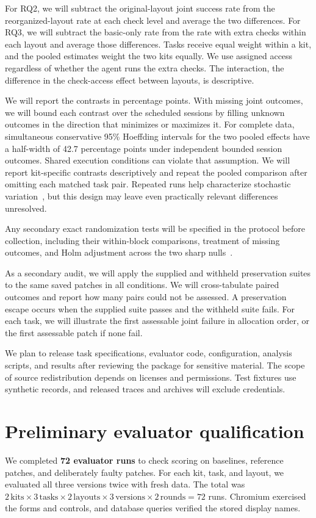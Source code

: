 \documentclass[11pt,a4paper]{article}
\begin{document}
For RQ2, we will subtract the original-layout joint success rate from the reorganized-layout rate at each check level and average the two differences. For RQ3, we will subtract the basic-only rate from the rate with extra checks within each layout and average those differences. Tasks receive equal weight within a kit, and the pooled estimates weight the two kits equally. We use assigned access regardless of whether the agent runs the extra checks. The interaction, the difference in the check-access effect between layouts, is descriptive.

We will report the contrasts in percentage points. With missing joint outcomes, we will bound each contrast over the scheduled sessions by filling unknown outcomes in the direction that minimizes or maximizes it. For complete data, simultaneous conservative 95\% Hoeffding intervals for the two pooled effects have a half-width of 42.7 percentage points under independent bounded session outcomes. Shared execution conditions can violate that assumption. We will report kit-specific contrasts descriptively and repeat the pooled comparison after omitting each matched task pair. Repeated runs help characterize stochastic variation~\cite{arcuri2014statistics}, but this design may leave even practically relevant differences unresolved.

Any secondary exact randomization tests will be specified in the protocol before collection, including their within-block comparisons, treatment of missing outcomes, and Holm adjustment across the two sharp nulls~\cite{holm1979multiple}.

As a secondary audit, we will apply the supplied and withheld preservation suites to the same saved patches in all conditions. We will cross-tabulate paired outcomes and report how many pairs could not be assessed. A preservation escape occurs when the supplied suite passes and the withheld suite fails. For each task, we will illustrate the first assessable joint failure in allocation order, or the first assessable patch if none fail.

We plan to release task specifications, evaluator code, configuration, analysis scripts, and results after reviewing the package for sensitive material. The scope of source redistribution depends on licenses and permissions. Test fixtures use synthetic records, and released traces and archives will exclude credentials.

\section{Preliminary evaluator qualification}\label{sec:results}\label{sec:account-qualification}
We completed \textbf{72 evaluator runs} to check scoring on baselines, reference patches, and deliberately faulty patches. For each kit, task, and layout, we evaluated all three versions twice with fresh data. The total was $2\,\text{kits}\times3\,\text{tasks}\times2\,\text{layouts}\times3\,\text{versions}\times2\,\text{rounds}=72$ runs. Chromium exercised the forms and controls, and database queries verified the stored display names.
\end{document}

